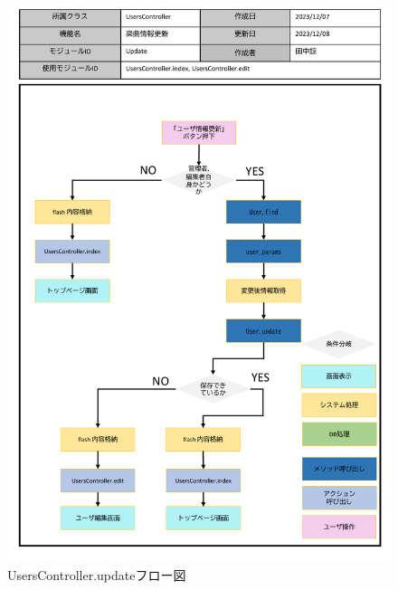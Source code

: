 \begin{figure}
    \centering
    \includegraphics[scale=0.7]{img/Users/pptx/UsersController_update.pdf}
    \caption{UsersController.updateフロー図}
\end{figure}


